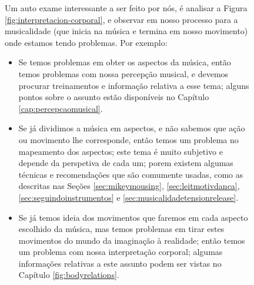 \begin{figure}[!h]
\begin{elaboracion}[title=Nossos problemas com a musicalidade]
Um auto exame interessante a ser feito por nós, é analisar a Figura \ref{fig:interpretacion-corporal},
e observar em  nosso processo para a musicalidade  
(que inicia na música e termina em nosso movimento)
onde estamos tendo problemas. Por exemplo:
\begin{itemize}
\item Se temos problemas em obter os aspectos da música, 
então temos problemas com nossa percepção musical,
e devemos procurar treinamentos e informação relativa a esse tema;
alguns pontos sobre o assunto estão disponíveis no Capítulo \ref{cap:percepcaomusical}.
\item Se já dividimos a música em aspectos, e não sabemos que ação ou movimento lhe corresponde,
então temos um problema no mapeamento dos aspectos;
este tema é muito subjetivo e depende da perspetiva de cada um;
porem existem algumas técnicas e recomendações que são comumente usadas,
como as descritas nas Seções \ref{sec:mikeymousing}, \ref{sec:leitmotivdanca}, 
\ref{sec:seguindoinstrumentos} e \ref{sec:musicalidadetensionrelease}.
\item Se já temos  ideia dos movimentos que faremos em cada aspecto escolhido da música,
mas temos problemas em tirar estes movimentos do mundo da imaginação à realidade;
então temos um problema com nossa interpretação corporal;
algumas informações relativas a este assunto podem ser vistas no Capítulo  \ref{fig:bodyrelations}.
\end{itemize}
\end{elaboracion}
\label{fig:testemusicalidade}
\end{figure}

